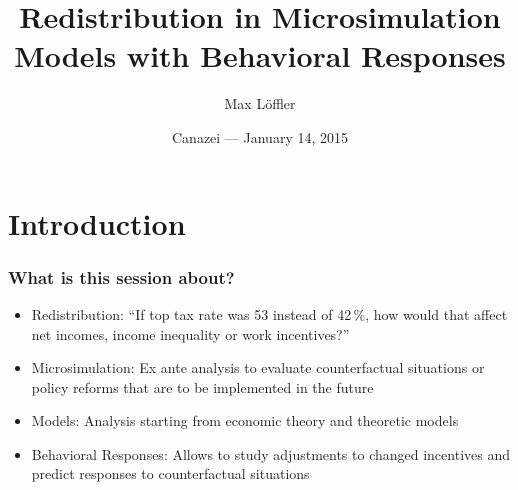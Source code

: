 \documentclass[handout,intlimits]{beamer}
\def\blue#1{\textcolor{zewblue}{#1}}
\begin{document}


\title{Redistribution in Microsimulation\\ Models with Behavioral Responses}
\author[Löffler]{Max Löffler}
\date[January 14, 2015]{Canazei --- January 14, 2015}


\begin{frame}[plain]
	\titlepage
\end{frame}





\section{Introduction}

\begin{frame}
\frametitle{What is this session about?}
\begin{itemize}
	\item \blue{Redistribution:} ``If top tax rate was 53 instead of 42\,\%, how would that affect net incomes, income inequality or work incentives?''
	\bigskip
	\item \blue{Microsimulation:} Ex ante analysis to evaluate counterfactual situations or policy reforms that are to be implemented in the future
	\bigskip
	\item \blue{Models:} Analysis starting from economic theory and theoretic models
	\bigskip
	\item \blue{Behavioral Responses:} Allows to study adjustments to changed incentives and predict responses to counterfactual situations
\end{itemize}
\end{frame}
\end{document}
